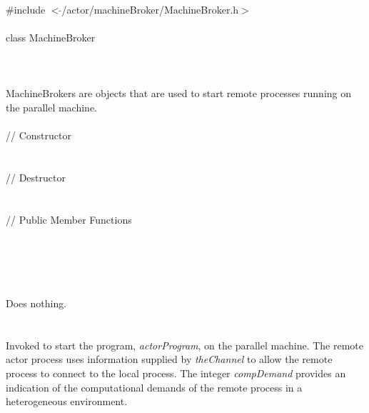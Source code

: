 
   \\
\indent \#include $<\tilde{ }$/actor/machineBroker/MachineBroker.h$>$  \\

  \\
\indent class MachineBroker \\

 \\
 \\

  \\
\indent MachineBrokers are objects that are used to start remote
processes running on the parallel machine. \\


  \\
\indent // Constructor  \\
  \\\\
\indent // Destructor \\
\\  \\
\indent // Public Member Functions  \\
\\

  \\
  \\

 \\
\\ 
Does nothing. \\

  \\
\\
Invoked to start the program, {\em actorProgram}, on the parallel
machine. The remote actor process uses information supplied by {\em
theChannel} to allow the remote process to connect to the local
process. The integer {\em compDemand} provides an indication of the
computational demands of the remote process in a heterogeneous
environment. 